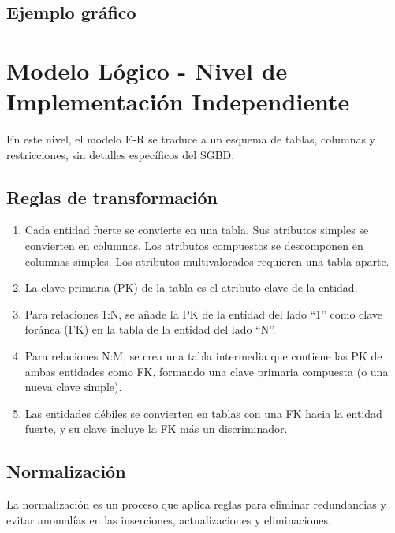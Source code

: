 \documentclass[12pt,a4paper,openany,oneside]{book}
\begin{document}
\subsection{Ejemplo gráfico}
\begin{center}
\end{center}

\section{Modelo Lógico - Nivel de Implementación Independiente}
En este nivel, el modelo E-R se traduce a un esquema de tablas, columnas y restricciones, sin detalles específicos del SGBD.

\subsection{Reglas de transformación}
\begin{enumerate}
    \item Cada entidad fuerte se convierte en una tabla. Sus atributos simples se convierten en columnas. Los atributos compuestos se descomponen en columnas simples. Los atributos multivalorados requieren una tabla aparte.
    \item La clave primaria (PK) de la tabla es el atributo clave de la entidad.
    \item Para relaciones 1:N, se añade la PK de la entidad del lado ``1'' como clave foránea (FK) en la tabla de la entidad del lado ``N''.
    \item Para relaciones N:M, se crea una tabla intermedia que contiene las PK de ambas entidades como FK, formando una clave primaria compuesta (o una nueva clave simple).
    \item Las entidades débiles se convierten en tablas con una FK hacia la entidad fuerte, y su clave incluye la FK más un discriminador.
\end{enumerate}

\subsection{Normalización}
La normalización es un proceso que aplica reglas para eliminar redundancias y evitar anomalías en las inserciones, actualizaciones y eliminaciones.
\end{document}
